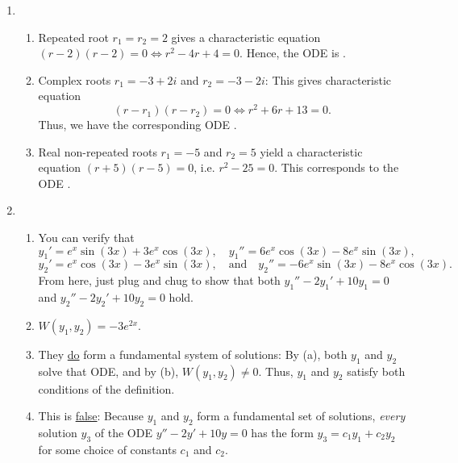 \documentclass[12pt]{article}
\theoremstyle{definition}
\theoremstyle{underl}
\begin{document}
\begin{enumerate}[topsep=0.125in,itemsep=9mm]
		\item \begin{enumerate}[itemsep=3mm]
			\item Repeated root $r_1=r_2=2$ gives a characteristic equation $(r-2)(r-2)=0\iff r^2-4r+4=0$. Hence, the ODE is .
			\item Complex roots $r_1=-3+2i$ and $r_2=-3-2i$: This gives characteristic equation \[(r-r_1)(r-r_2)=0\iff r^2+6r+13=0.\] 
			Thus, we have the corresponding ODE .
			\item Real non-repeated roots $r_1=-5$ and $r_2=5$ yield a characteristic equation $(r+5)(r-5)=0$, i.e. $r^2-25=0$. This corresponds to the ODE .
		\end{enumerate}
		
	
		\item \begin{enumerate}[itemsep=3mm]
			\item You can verify that
			\[y_1'=e^x \sin (3 x)+3 e^x \cos (3 x),\quad y_1''=6 e^x \cos (3 x)-8 e^x \sin (3 x),\]
			\[y_2'=e^x \cos (3 x)-3 e^x \sin (3 x),\quad\text{and}\quad y_2''=-6 e^x \sin (3 x)-8 e^x \cos (3 x).\]
			From here, just plug and chug to show that both $y_1''-2y_1'+10y_1=0$ and $y_2''-2y_2'+10y_2=0$ hold.
			\item $W(y_1,y_2)=-3e^{2x}$.
			\item They \ul{do} form a fundamental system of solutions: By (a), both $y_1$ and $y_2$ solve that ODE, and by (b), $W(y_1,y_2)\neq 0$. Thus, $y_1$ and $y_2$ satisfy both conditions of the definition.
			\item This is \ul{false}: Because $y_1$ and $y_2$ form a fundamental set of solutions, \textit{every} solution $y_3$ of the ODE $y''-2y'+10y=0$ has the form $y_3=c_1y_1+c_2y_2$ for some choice of constants $c_1$ and $c_2$.
		\end{enumerate}
	\end{enumerate}
\end{document}
